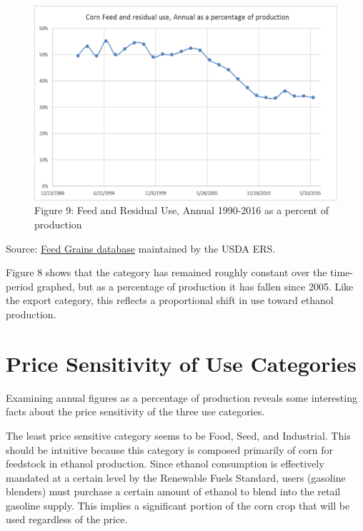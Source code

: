 \documentclass[]{book}
\theoremstyle{definition}
\theoremstyle{definition}
\theoremstyle{remark}
\begin{document}
\begin{figure}[htbp]
\centering
\includegraphics{Excel-files/IntroductiontoCommodityTS-FeedGrains_Corn_files/image031.png}
\caption{Figure 9: Feed and Residual Use, Annual 1990-2016 as a percent
of production}
\end{figure}

Source:
\href{http://www.ers.usda.gov/data-products/feed-grains-database/feed-grains-yearbook-tables.aspx\#26780}{Feed
Grains database} maintained by the USDA ERS.

Figure 8 shows that the category has remained roughly constant over the
time-period graphed, but as a percentage of production it has fallen
since 2005. Like the export category, this reflects a proportional shift
in use toward ethanol production.

\section{Price Sensitivity of Use
Categories}\label{price-sensitivity-of-use-categories}

Examining annual figures as a percentage of production reveals some
interesting facts about the price sensitivity of the three use
categories.

The least price sensitive category seems to be Food, Seed, and
Industrial. This should be intuitive because this category is composed
primarily of corn for feedstock in ethanol production. Since ethanol
consumption is effectively mandated at a certain level by the Renewable
Fuels Standard, users (gasoline blenders) must purchase a certain amount
of ethanol to blend into the retail gasoline supply. This implies a
significant portion of the corn crop that will be used regardless of the
price.
\end{document}
